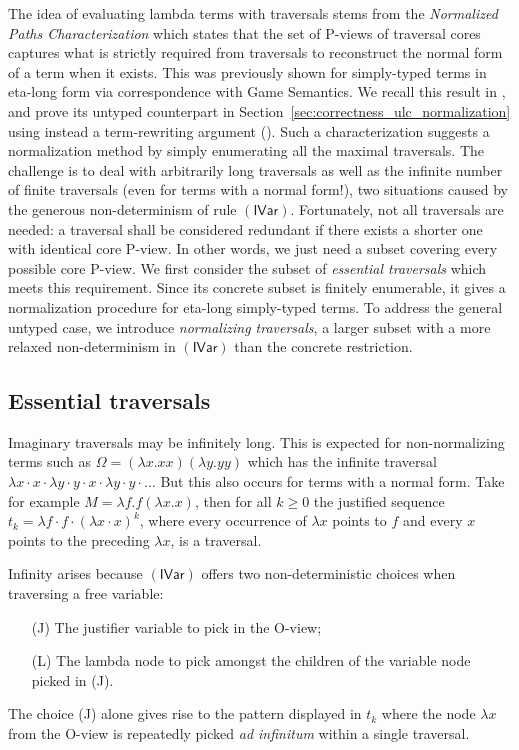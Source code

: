 \documentclass[xchauthor,chkrefs,GCNS,amsmath,amsthm,rotating,leaveRGB]{tcsg}
\theoremstyle{plain}
\theoremstyle{definition}
\begin{document}
The idea of evaluating lambda terms with traversals stems from the
\emph{Normalized Paths Characterization} which states that the set of P-views
of traversal cores captures what is strictly required from traversals to
reconstruct the normal form of a term when it exists. This was previously
shown for simply-typed terms in eta-long form via correspondence with Game
Semantics. We recall this result in
, and prove its untyped
counterpart in Section~\ref{sec:correctness_ulc_normalization} using instead
a term-rewriting argument ().
Such a characterization suggests a normalization method by simply enumerating
all the maximal traversals. The challenge is to deal with arbitrarily long
traversals as well as the infinite number of finite traversals (even for
terms with a normal form!), two situations caused by the generous
non-determinism of rule $\mathsf{(IVar)}$. Fortunately, not all traversals
are needed: a traversal shall be considered redundant if there exists a
shorter one with identical core P-view. In other words, we just need a subset
covering every possible core P-view. We first consider the subset of
\emph{essential traversals} which meets this requirement. Since its concrete
subset is finitely enumerable, it gives a normalization procedure for
eta-long simply-typed terms. To address the general untyped case, we
introduce \emph{normalizing traversals}, a larger subset with a more relaxed
non-determinism in $\mathsf{(IVar)}$ than the concrete restriction.

\subsection{Essential traversals}\label{sec4.1}

Imaginary traversals may be infinitely long. This is expected for
non-normalizing terms such as $\Omega = (\lambda x. x x)(\lambda y. y y)$
which has the infinite traversal $\lambda x \cdot x \cdot \lambda y \cdot y
\cdot x \cdot \lambda y \cdot y \cdot \ldots $ But this also occurs for terms
with a normal form. Take for example $M = \lambda f . f (\lambda x. x)$, then
for all $k\geq 0$ the justified sequence $t_{k} = \lambda f \cdot f \cdot
(\lambda x \cdot  x)^{k}$, where every occurrence of $\lambda x$ points to
$f$ and every $x$ points to the preceding $\lambda x$, is a traversal.

Infinity arises because $\mathsf{(IVar)}$ offers two non-deterministic
choices when traversing a free variable:
%
\begin{itemize}[(L)]
\item[(J)] The justifier variable to pick in the O-view;
\item[(L)] The lambda node to pick amongst the children of the variable node picked in (J).
\end{itemize}
%
The choice (J) alone gives rise to the pattern displayed in $t_{k}$ where the
node $\lambda x$ from the O-view is repeatedly picked \emph{ad infinitum}
within a single traversal.
\end{document}
